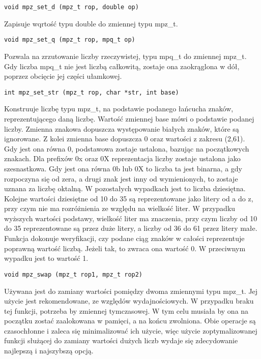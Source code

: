 \documentclass[twoside,a4paper]{book}
\begin{document}
\begin{lstlisting}
void mpz_set_d (mpz_t rop, double op)
\end{lstlisting}
Zapisuje wqrtość typu double do zmiennej typu mpz\_t.

\begin{lstlisting}
void mpz_set_q (mpz_t rop, mpq_t op)
\end{lstlisting}
Pozwala na zrzutowanie liczby rzeczywistej, typu mpq\_t do zmiennej mpz\_t. Gdy liczba mpq\_t nie jest liczbą całkowitą, zostaje ona zaokrąglona w dół, poprzez obcięcie jej części ułamkowej.

\begin{lstlisting}
int mpz_set_str (mpz_t rop, char *str, int base)
\end{lstlisting}
Konstruuje liczbę typu mpz\_t, na podstawie podanego łańcucha znaków, reprezentującego daną liczbę. Wartość zmiennej base mówi o podstawie podanej liczby. Zmienna znakowa dopuszcza występowanie białych znaków, które są ignorowane. Z kolei zmienna base dopuszcza 0 oraz wartości z zakresu (2,61). Gdy jest ona równa 0, podstawowa zostaje ustalona, bazując na początkowych znakach. Dla prefixów 0x oraz 0X reprezentacja liczby zostaje ustalona jako szesnastkowa. Gdy jest ona równa 0b lub 0X to liczba ta jest binarna, a gdy rozpoczyna się od zera, a drugi znak jest inny od wymienionych, to zostaje uznana za liczbę oktalną. W pozostałych wypadkach jest to liczba dziesiętna. Kolejne wartości dziesiętne od 10 do 35 są reprezentowane jako litery od a do z, przy czym nie ma rozróżnienia ze względu na wielkość liter. W przypadku wyższych wartości podstawy, wielkość liter ma znaczenia, przy czym liczby od 10 do 35 reprezentowane są przez duże litery, a liczby od 36 do 61 przez litery małe. Funkcja dokonuje weryfikacji, czy podane ciąg znaków w całości reprezentuje poprawną wartość liczbą. Jeżeli tak, to zwraca ona wartość 0. W przeciwnym wypadku jest to wartość 1.

\begin{lstlisting}
void mpz_swap (mpz_t rop1, mpz_t rop2)
\end{lstlisting}
Używana jest do zamiany wartości pomiędzy dwoma zmiennymi typu mpz\_t. Jej użycie jest rekomendowane, ze względów wydajnościowych. W przypadku braku tej funkcji, potrzeba by zmiennej tymczasowej. W tym celu musiała by ona na początku zostać zaalokowana w pamięci, a na końcu zwolniona. Obie operacje są czasochłonne i zaleca się minimalizować ich użycie, więc użycie zoptymalizowanej funkcji służącej do zamiany wartości dużych liczb wydaje się zdecydowanie najlepszą i najszybszą opcją.
\end{document}
